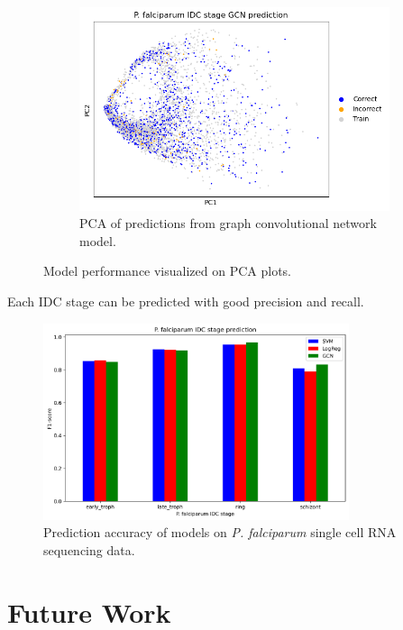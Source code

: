 \documentclass{article}
\begin{document}
\begin{figure}[!h]
\begin{subfigure}[b]{0.3\textwidth}
      \includegraphics[width=\textwidth]{figures/pca_Pf_prediction_GCN.png}
      \caption{PCA of predictions from graph convolutional network model.}
      \label{fig:sub3}
  \end{subfigure}
  
  \caption{Model performance visualized on PCA plots.}
  \label{fig:main}
\end{figure}

Each IDC stage can be predicted with good precision and recall. 

\begin{figure}[H]
  \centering
  \includegraphics[width=0.8\textwidth]{figures/Pf_prediction.png}
  \caption{Prediction accuracy of models on \textit{P. falciparum} single cell RNA sequencing data.}
\end{figure}

\medskip

\section{Future Work}

\newpage


\end{document}
